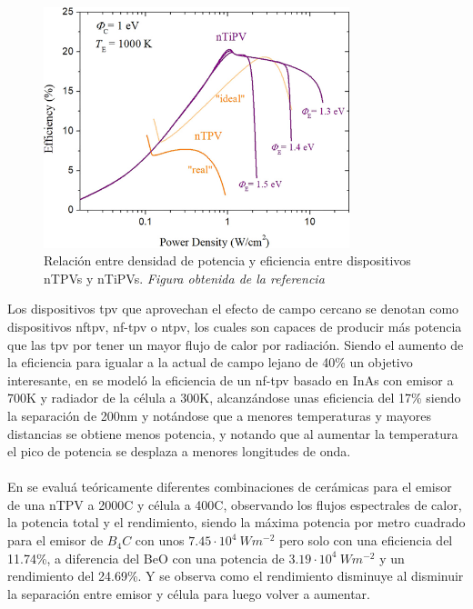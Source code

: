 \begin{figure}[H]
	\centering
		\includegraphics[height=7cm]{figuras/PowerDensityVSEfficiency_nTiPV.png}
	\caption[Relación entre densidad de potencia y eficiencia entre dispositivos nTPVs y nTiPVs]{Relación entre densidad de potencia y eficiencia entre dispositivos nTPVs y nTiPVs. \textit{Figura obtenida de la referencia \cite{thermoionic_TPV_NF}}}
	\label{fig:PowerDensityVSEfficiency_nTiPV}
\end{figure}
Los dispositivos \acrshort{tpv} que aprovechan el efecto de campo cercano se denotan como dispositivos \acrshort{nftpv}, \acrshort{nf-tpv} o \acrshort{ntpv}, los cuales son capaces de producir más potencia que las \acrshort{tpv} por tener un mayor flujo de calor por radiación. Siendo el aumento de la eficiencia para igualar a la actual de campo lejano de 40\% \cite{thermophotovoltaic_40} un objetivo interesante, en \cite{modelEfficiency_NF_TPV} se modeló la eficiencia de un \acrshort{nf-tpv} basado en InAs con emisor a  700K y radiador de la célula a 300K, alcanzándose unas eficiencia del 17\% siendo la separación de 200nm y notándose que a menores temperaturas y mayores distancias se obtiene menos potencia, y notando que al aumentar la temperatura el pico de potencia se desplaza a menores longitudes de onda.\\\\
En \cite{differentEmitterCeramics} se evaluá teóricamente diferentes combinaciones de cerámicas para el emisor de una nTPV a 2000\textdegree C y célula a 400\textdegree C, observando los flujos espectrales de calor, la potencia total y el rendimiento, siendo la máxima potencia por metro cuadrado para el emisor de $B_4C$ con unos $7.45\cdot 10^4 \ Wm^{-2}$ pero solo con una eficiencia del 11.74\%, a diferencia del BeO con una potencia de $3.19\cdot 10^4 \ Wm^{-2}$ y un rendimiento del 24.69\%. Y se observa como el rendimiento disminuye al disminuir la separación entre emisor y célula para luego volver a aumentar.\\\\
